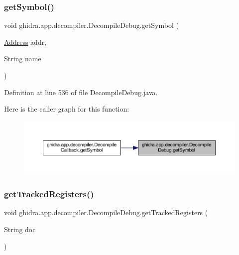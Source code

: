 \subsubsection{\texorpdfstring{getSymbol()}{getSymbol()}}
{\footnotesize\ttfamily void ghidra.\+app.\+decompiler.\+Decompile\+Debug.\+get\+Symbol (\begin{DoxyParamCaption}\item[{\mbox{\hyperlink{class_address}{Address}}}]{addr,  }\item[{String}]{name }\end{DoxyParamCaption})\hspace{0.3cm}{\ttfamily [inline]}}



Definition at line 536 of file Decompile\+Debug.\+java.

Here is the caller graph for this function\+:
\nopagebreak
\begin{figure}[H]
\begin{center}
\leavevmode
\includegraphics[width=350pt]{classghidra_1_1app_1_1decompiler_1_1_decompile_debug_a22f376783b458dd183febc07c79e9243_icgraph}
\end{center}
\end{figure}
\mbox{\label{classghidra_1_1app_1_1decompiler_1_1_decompile_debug_a31db2fa005425108a5cbca58049f48ae}} 
\subsubsection{\texorpdfstring{getTrackedRegisters()}{getTrackedRegisters()}}
{\footnotesize\ttfamily void ghidra.\+app.\+decompiler.\+Decompile\+Debug.\+get\+Tracked\+Registers (\begin{DoxyParamCaption}\item[{String}]{doc }\end{DoxyParamCaption})\hspace{0.3cm}{\ttfamily [inline]}}



